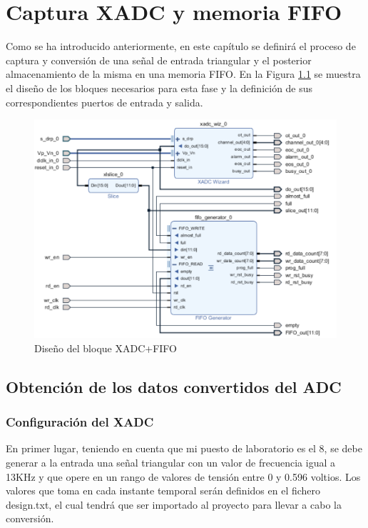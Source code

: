 \chapter{Captura XADC y memoria FIFO}
\label{section:xadc_fifo}


Como se ha introducido anteriormente, en este capítulo se definirá el proceso de captura y conversión de una señal de entrada triangular y el posterior almacenamiento de la misma en una memoria FIFO. En la Figura \ref{fig:xadc_fifo} se muestra el diseño de los bloques necesarios para esta fase y la definición de sus correspondientes puertos de entrada y salida.

\vspace{3mm}

\begin{figure}[h]
    \centering
    \includegraphics[width=1\textwidth]{img/diseno/xadc_fifo.PNG}
    \caption{Diseño del bloque XADC+FIFO}
    \label{fig:xadc_fifo}
\end{figure}
    
\vspace{3mm}

\section{Obtención de los datos convertidos del ADC}

\subsection{Configuración del XADC}

En primer lugar, teniendo en cuenta que mi puesto de laboratorio es el 8, se debe generar a la entrada una señal triangular con un valor de frecuencia igual a 13KHz y que opere en un rango de valores de tensión entre 0 y 0.596 voltios. Los valores que toma en cada instante temporal serán definidos en el fichero design.txt, el cual tendrá que ser importado al proyecto para llevar a cabo la conversión.

